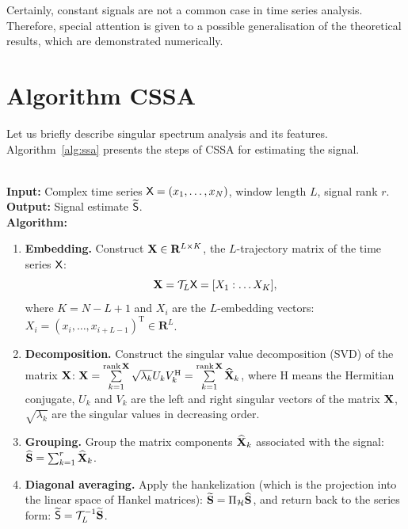 \documentclass[engproc, submit, article,pdftex,moreauthors]{Definitions/mdpi}
\def\spaceR{\mathbf{R}}
\DeclareMathOperator\rank{rank}
\begin{document}
Certainly, constant signals are not a common case in time series analysis. Therefore, special attention is given to a possible generalisation of the theoretical results, which are demonstrated numerically.

\section{Algorithm CSSA}
\label{sec:basessa}

Let us briefly describe singular spectrum analysis and its features. Algorithm~\ref{alg:ssa} presents the steps of CSSA for estimating the signal.

\begin{Algorithm}
\label{alg:ssa}
~\\
\textbf{Input:} Complex time series $\textsf{X} = (x_1, \dots, x_N)$, window length $L$,
    signal rank $r$.\\
\textbf{Output:} Signal estimate $\widetilde{\textsf{S}}$.\\
\textbf{Algorithm:}
\begin{enumerate}
    \item \textbf{Embedding.}
        \label{item:embedding}
        Construct $\bfX \in \spaceR^{L \times K}$, the $L$-trajectory matrix of the time series $\textsf{X}$:
        $$\mathbf{X} = \mathcal{T}_L \textsf{X} = [X_1 : \dots X_K],$$
        where $K = N - L + 1$
        and $X_i$ are the $L$-embedding vectors:
        $X_i = (x_i, \dots, x_{i+L-1})^\mathrm{T} \in \spaceR^L$.
    \item \textbf{Decomposition.}
        \label{item:decomposition}
        Construct the singular value decomposition (SVD) of the matrix $\mathbf{X}$:
        $\bfX =
        \sum\limits_{k=1}^{\rank \bfX} \sqrt{\lambda_k} U_k V_k^\mathrm{H} = \sum\limits_{k=1}^{\rank \bfX} \widehat{\bfX}_k$,
        where $\mathrm{H}$ means the Hermitian conjugate, $U_k$ and $V_k$ are the left and right singular vectors of the matrix $\mathbf{X}$,
        $\sqrt{\lambda_k}$ are the singular values in decreasing order.
    \item \textbf{Grouping.} Group the matrix components $\widehat{\mathbf{X}}_k$ associated with the signal:
        $\widehat{\mathbf{S}} = \sum_{k=1}^r \widehat{\mathbf{X}}_k$.
    \item \textbf{Diagonal averaging.}
        \label{item:reconstruction}
        Apply the hankelization (which is the projection into the linear space of Hankel matrices):
        $\widetilde{\mathbf{S}} = \Pi_{\mathcal{H}} \widehat{\mathbf{S}}$,
        and return back to the series form:
        $\widetilde{\textsf{S}} = \mathcal{T}_L^{-1} \widetilde{\mathbf{S}}$.
\end{enumerate}
\end{Algorithm}
\end{document}
